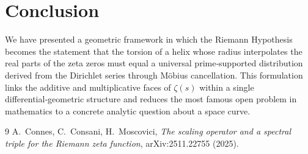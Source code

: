 \documentclass[12pt,a4paper]{article}
\begin{document}
\section{Conclusion}
We have presented a geometric framework in which the Riemann Hypothesis becomes the statement that the torsion of a helix whose radius interpolates the real parts of the zeta zeros must equal a universal prime‑supported distribution derived from the Dirichlet series through M\"obius cancellation.  This formulation links the additive and multiplicative faces of $\zeta(s)$ within a single differential‑geometric structure and reduces the most famous open problem in mathematics to a concrete analytic question about a space curve.

\begin{thebibliography}{9}
A.~Connes, C.~Consani, H.~Moscovici,
\emph{The scaling operator and a spectral triple for the Riemann zeta function},
arXiv:2511.22755 (2025).
\end{thebibliography}
\end{document}
